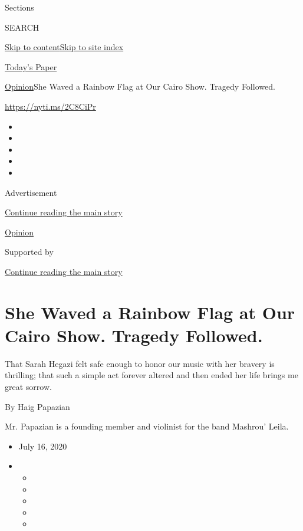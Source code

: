 Sections

SEARCH

\protect\hyperlink{site-content}{Skip to
content}\protect\hyperlink{site-index}{Skip to site index}

\href{https://myaccount.nytimes3xbfgragh.onion/auth/login?response_type=cookie\&client_id=vi}{}

\href{https://www.nytimes3xbfgragh.onion/section/todayspaper}{Today's
Paper}

\href{/section/opinion}{Opinion}\textbar{}She Waved a Rainbow Flag at
Our Cairo Show. Tragedy Followed.

\url{https://nyti.ms/2C8CiPr}

\begin{itemize}
\item
\item
\item
\item
\item
\end{itemize}

Advertisement

\protect\hyperlink{after-top}{Continue reading the main story}

\href{/section/opinion}{Opinion}

Supported by

\protect\hyperlink{after-sponsor}{Continue reading the main story}

\hypertarget{she-waved-a-rainbow-flag-at-our-cairo-show-tragedy-followed}{%
\section{She Waved a Rainbow Flag at Our Cairo Show. Tragedy
Followed.}\label{she-waved-a-rainbow-flag-at-our-cairo-show-tragedy-followed}}

That Sarah Hegazi felt safe enough to honor our music with her bravery
is thrilling; that such a simple act forever altered and then ended her
life brings me great sorrow.

By Haig Papazian

Mr. Papazian is a founding member and violinist for the band Mashrou'
Leila.

\begin{itemize}
\item
  July 16, 2020
\item
  \begin{itemize}
  \item
  \item
  \item
  \item
  \item
  \end{itemize}
\end{itemize}

